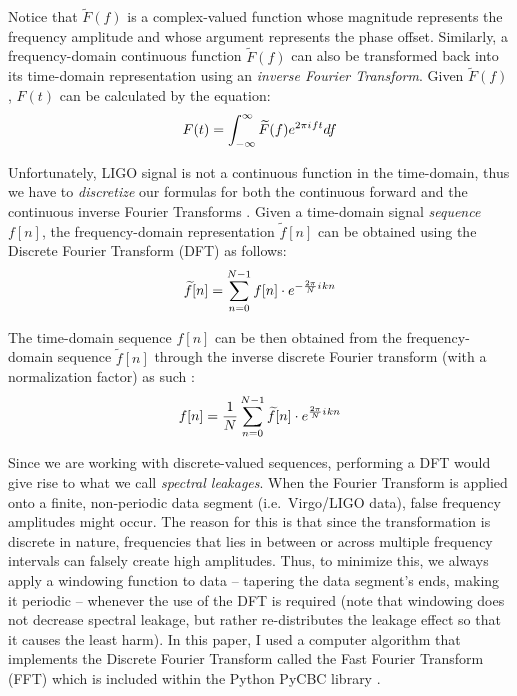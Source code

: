 \documentclass[preprint,
letterpaper,
 amsmath,amssymb,
 aps,
]{revtex4-2}
\newcommand{\iu}{{i\mkern1mu}}
\begin{document}
Notice that $\widetilde{F}(f)$ is a complex-valued function whose magnitude represents the frequency amplitude and whose argument represents the phase offset. Similarly, a frequency-domain continuous function $\widetilde{F}(f)$ can also be transformed back into its time-domain representation using an \textit{inverse Fourier Transform}. Given $\widetilde{F}(f)$, $F(t)$ can be calculated by the equation:
\begin{equation}
F(t) = \int_{-\infty}^{\infty}\widetilde{F}(f)e^{2\pi\iu ft} df
\end{equation}

Unfortunately, LIGO signal is not a continuous function in the time-domain, thus we have to \textit{discretize} our formulas for both the continuous forward and the continuous inverse Fourier Transforms \cite{dsptextbook}. Given a time-domain signal \textit{sequence} $f[n]$, the frequency-domain representation $\widetilde{f}[n]$ can be obtained using the Discrete Fourier Transform (DFT) as follows\cite{roberts_2020}:
\begin{equation}
\widetilde{f}[n]=\sum _{n=0}^{N-1}f[n]\cdot e^{-{\frac {2\pi}{N}\iu kn}}
\end{equation}

The time-domain sequence $f[n]$ can be then obtained from the frequency-domain sequence $\widetilde{f}[n]$ through the inverse discrete Fourier transform (with a normalization factor) as such \cite{roberts_2020}:
\begin{equation}
f[n]=\frac{1}{N}\sum _{n=0}^{N-1}\widetilde{f}[n]\cdot e^{{\frac {2\pi}{N}\iu kn}}
\end{equation}

Since we are working with discrete-valued sequences, performing a DFT would give rise to what we call \textit{spectral leakages}. When the Fourier Transform is applied onto a finite, non-periodic data segment (i.e.\ Virgo/LIGO data), false frequency amplitudes might occur. The reason for this is that since the transformation is discrete in nature, frequencies that lies in between or across multiple frequency intervals can falsely create high amplitudes. Thus, to minimize this, we always apply a windowing function to data – tapering the data segment's ends, making it periodic – whenever the use of the DFT is required (note that windowing does not decrease spectral leakage, but rather re-distributes the leakage effect so that it causes the least harm). In this paper, I used a computer algorithm that implements the Discrete Fourier Transform called the Fast Fourier Transform (FFT) which is included within the Python PyCBC library \cite{numpy}.
\end{document}
